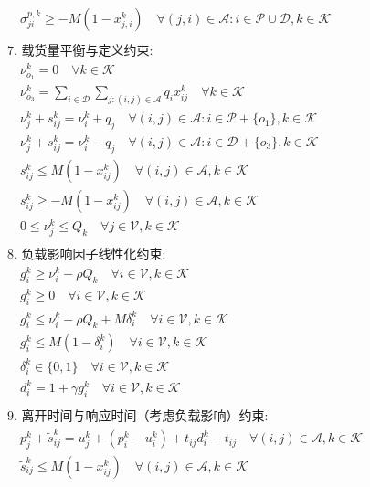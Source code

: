 \documentclass[11pt]{ctexart}
\begin{document}
\begin{align*}
& \quad \sigma_{j i}^{p,k} \ge -M(1 - x_{j, i}^k) \quad \forall (j, i) \in \mathcal{A}: i \in \mathcal{P} \cup \mathcal{D}, k \in \mathcal{K} \\
\\
& \text{7. 载货量平衡与定义约束:} \\
& \quad \nu_{o_1}^k = 0 \quad \forall k \in \mathcal{K} \\
& \quad \nu_{o_3}^k = \sum_{i \in \mathcal{D}} \sum_{j: (i,j) \in \mathcal{A}} q_i x_{ij}^k \quad \forall k \in \mathcal{K} \\
& \quad \nu_j^k + s_{ij}^k = \nu_i^k + q_j \quad \forall (i, j) \in \mathcal{A}: i \in \mathcal{P} + \{o_1\}, k \in \mathcal{K} \\
& \quad \nu_j^k + s_{ij}^k = \nu_i^k - q_j \quad \forall (i, j) \in \mathcal{A}: i \in \mathcal{D} + \{o_3\}, k \in \mathcal{K} \\
& \quad s_{ij}^k \le M(1 - x_{ij}^k) \quad \forall (i, j) \in \mathcal{A}, k \in \mathcal{K} \\
& \quad s_{ij}^k \ge -M(1 - x_{ij}^k) \quad \forall (i, j) \in \mathcal{A}, k \in \mathcal{K} \\
& \quad 0 \le \nu_j^k \le Q_k \quad \forall j \in \mathcal{V}, k \in \mathcal{K} \\
\\
& \text{8. 负载影响因子线性化约束:} \\
& \quad g_i^k \ge \nu_i^k - \rho Q_k \quad \forall i \in \mathcal{V}, k \in \mathcal{K} \\
& \quad g_i^k \ge 0 \quad \forall i \in \mathcal{V}, k \in \mathcal{K} \\
& \quad g_i^k \le \nu_i^k - \rho Q_k + M \delta_i^k \quad \forall i \in \mathcal{V}, k \in \mathcal{K} \\
& \quad g_i^k \le M(1 - \delta_i^k) \quad \forall i \in \mathcal{V}, k \in \mathcal{K} \\
& \quad \delta_i^k \in \{0, 1\} \quad \forall i \in \mathcal{V}, k \in \mathcal{K} \\
& \quad d_i^k = 1 + \gamma g_i^k \quad \forall i \in \mathcal{V}, k \in \mathcal{K} \\
\\
& \text{9. 离开时间与响应时间（考虑负载影响）约束:} \\
& \quad p_j^k + \tilde{s}_{ij}^k = u_j^k + (p_i^k - u_i^k) + t_{ij} d_i^k - t_{ij} \quad \forall (i, j) \in \mathcal{A}, k \in \mathcal{K} \\
& \quad \tilde{s}_{ij}^k \le M(1 - x_{ij}^k) \quad \forall (i, j) \in \mathcal{A}, k \in \mathcal{K} \\

\end{align*}
\end{document}
